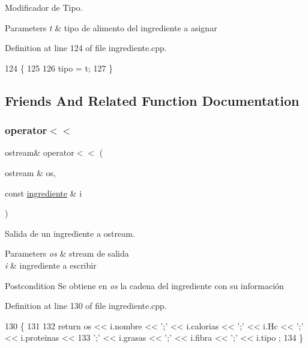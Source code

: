 Modificador de Tipo. 


\begin{DoxyParams}{Parameters}
{\em t} & tipo de alimento del ingrediente a asignar \\
\hline
\end{DoxyParams}


Definition at line 124 of file ingrediente.\+cpp.


\begin{DoxyCode}
124                                  \{
125 
126     tipo = t;
127 \}
\end{DoxyCode}


\subsection{Friends And Related Function Documentation}
\mbox{\label{classingrediente_af02aa89e83969f7073a8da7e64ad9b87}} 
\subsubsection{\texorpdfstring{operator$<$$<$}{operator<<}}
{\footnotesize\ttfamily ostream\& operator$<$$<$ (\begin{DoxyParamCaption}\item[{ostream \&}]{os,  }\item[{const \hyperlink{classingrediente}{ingrediente} \&}]{i }\end{DoxyParamCaption})\hspace{0.3cm}{\ttfamily [friend]}}



Salida de un ingrediente a ostream. 


\begin{DoxyParams}{Parameters}
{\em os} & stream de salida \\
\hline
{\em i} & ingrediente a escribir \\
\hline
\end{DoxyParams}
\begin{DoxyPostcond}{Postcondition}
Se obtiene en {\itshape os} la cadena del ingrediente con su información 
\end{DoxyPostcond}


Definition at line 130 of file ingrediente.\+cpp.


\begin{DoxyCode}
130                                                         \{
131 
132     \textcolor{keywordflow}{return} os << i.nombre << \textcolor{charliteral}{';'} << i.calorias << \textcolor{charliteral}{';'} << i.Hc << \textcolor{charliteral}{';'} << i.proteinas <<
133     \textcolor{charliteral}{';'} << i.grasas << \textcolor{charliteral}{';'} << i.fibra << \textcolor{charliteral}{';'} << i.tipo ;
134 \}
\end{DoxyCode}
\mbox{\label{classingrediente_a76d568aa86c9c0783c4b108b9e0f1023}} 
